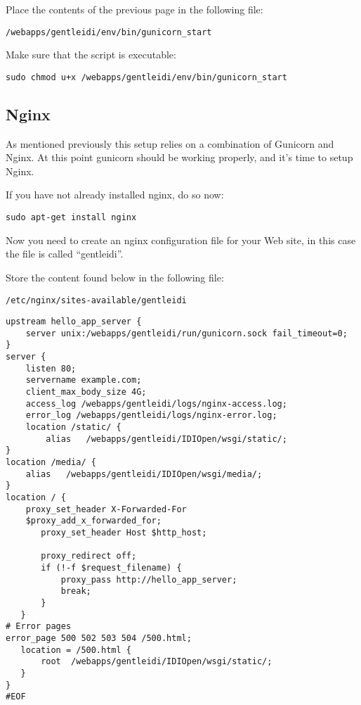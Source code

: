 Place the contents of the previous page in the following file:
\begin{verbatim}
/webapps/gentleidi/env/bin/gunicorn_start
\end{verbatim}

Make sure that the script is executable:

\begin{verbatim}
sudo chmod u+x /webapps/gentleidi/env/bin/gunicorn_start
\end{verbatim}

\subsection{Nginx}
As mentioned previously this setup relies on a combination of Gunicorn
and Nginx. At this point gunicorn should be working properly, and
it's time to setup Nginx.

If you have not already installed nginx, do so now:

\begin{verbatim}
sudo apt-get install nginx
\end{verbatim}

Now you need to create an nginx configuration file for your Web site, 
in this case the file is called ``gentleidi''.

Store the content found below in the following file: 
\begin{verbatim}
/etc/nginx/sites-available/gentleidi
\end{verbatim}

\begin{verbatim}
upstream hello_app_server {
    server unix:/webapps/gentleidi/run/gunicorn.sock fail_timeout=0;
}
server {
    listen 80;
    servername example.com;
    client_max_body_size 4G;
    access_log /webapps/gentleidi/logs/nginx-access.log;
    error_log /webapps/gentleidi/logs/nginx-error.log;
    location /static/ {
        alias   /webapps/gentleidi/IDIOpen/wsgi/static/;
}
location /media/ {
    alias   /webapps/gentleidi/IDIOpen/wsgi/media/;
}
location / {
    proxy_set_header X-Forwarded-For
    $proxy_add_x_forwarded_for;
       proxy_set_header Host $http_host;

       proxy_redirect off;
       if (!-f $request_filename) {
           proxy_pass http://hello_app_server;
           break;
       }
   }
# Error pages
error_page 500 502 503 504 /500.html;
   location = /500.html {
       root  /webapps/gentleidi/IDIOpen/wsgi/static/;
   }
}
#EOF
\end{verbatim}

